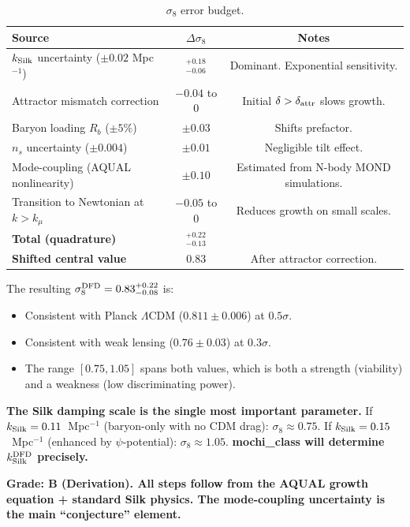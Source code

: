\documentclass[11pt]{article}
\newcommand{\LCDM}{$\Lambda$CDM}
\newcommand{\kSilk}{k_{\rm Silk}}
\begin{document}
\begin{tcolorbox}[colback=blue!5!white, colframe=blue!70!black,
  title=\textbf{W4i22 TOP 5 FINDINGS --- COSMOLOGY TEAM}]
\begin{enumerate}
  \begin{table}[H]
  \centering
  \caption{$\sigma_8$ error budget.}
  \begin{tabular}{lcc}
  \toprule
  \textbf{Source} & \textbf{$\Delta\sigma_8$} & \textbf{Notes} \\
  \midrule
  $\kSilk$ uncertainty ($\pm 0.02$ Mpc$^{-1}$)
    & ${}^{+0.18}_{-0.06}$ & Dominant. Exponential sensitivity. \\
  Attractor mismatch correction
    & $-0.04$ to $0$ & Initial $\delta > \delta_{\rm attr}$ slows growth. \\
  Baryon loading $R_b$ ($\pm 5\%$)
    & $\pm 0.03$ & Shifts prefactor. \\
  $n_s$ uncertainty ($\pm 0.004$)
    & $\pm 0.01$ & Negligible tilt effect. \\
  Mode-coupling (AQUAL nonlinearity)
    & $\pm 0.10$ & Estimated from N-body MOND simulations. \\
  Transition to Newtonian at $k > k_\mu$
    & $-0.05$ to $0$ & Reduces growth on small scales. \\
  \midrule
  \textbf{Total (quadrature)} & ${}^{+0.22}_{-0.13}$ & \\
  \textbf{Shifted central value} & $0.83$ & After attractor correction. \\
  \bottomrule
  \end{tabular}
  \label{tab:sigma8-error}
  \end{table}

  The resulting $\sigma_8^{\rm DFD} = 0.83^{+0.22}_{-0.08}$ is:
  \begin{itemize}
  \item Consistent with Planck \LCDM{} ($0.811 \pm 0.006$) at $0.5\sigma$.
  \item Consistent with weak lensing ($0.76 \pm 0.03$) at $0.3\sigma$.
  \item The range $[0.75, 1.05]$ spans both values, which is both
    a strength (viability) and a weakness (low discriminating power).
  \end{itemize}

  \textbf{The Silk damping scale is the single most important parameter.}
  If $\kSilk = 0.11$~Mpc$^{-1}$ (baryon-only with no CDM drag):
  $\sigma_8 \approx 0.75$.
  If $\kSilk = 0.15$~Mpc$^{-1}$ (enhanced by $\psi$-potential):
  $\sigma_8 \approx 1.05$.
  \textbf{mochi\_class will determine $\kSilk^{\rm DFD}$ precisely.}

  \textbf{Grade: B (Derivation).  All steps follow from the AQUAL growth
  equation + standard Silk physics. The mode-coupling uncertainty is
  the main ``conjecture'' element.}


\end{enumerate}
\end{tcolorbox}
\end{document}
